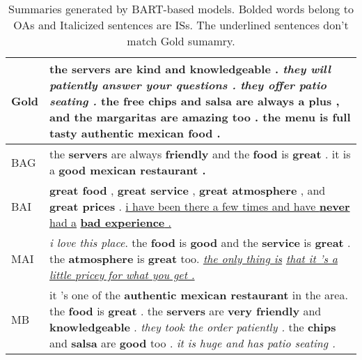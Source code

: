 \begin{table}[th]
	\begin{center}
		\scriptsize
		\begin{tabular}{|l|m{6.2cm}|}	
			\hline
			Gold & 
			the \textbf{servers} are \textbf{kind} and \textbf{knowledgeable} . \textit{they will} 
			\textit{patiently answer your questions .} \textit{they offer patio  seating .} 
			the \textbf{free chips} and \textbf{salsa} are always a plus , and the \textbf{margaritas} are \textbf{amazing} too . the menu is \textbf{full tasty authentic mexican food .} \\
			\hline
			BAG & the \textbf{servers} are always \textbf{friendly} and the \textbf{food} is \textbf{great} . it is a \textbf{good mexican restaurant .} \\
			\hline
			BAI & \textbf{great food} , \textbf{great service} , \textbf{great atmosphere} , and \textbf{great prices} . \underline{i have been there a few times and have \textbf{never} had a} \underline{\textbf{bad experience} . }
			\vspace{0.15em}
			\\
			\hline
			MAI & \textit{i love this place}. the \textbf{food} is \textbf{good} and the \textbf{service} is \textbf{great} . the \textbf{atmosphere} is \textbf{great} too. 
			\textit{\underline{the only thing is} \underline{that it 's a little pricey for what you get .}}
			\vspace{0.15em}
			\\
			\hline
			MB & it 's one of the \textbf{authentic mexican restaurant} in the area. the \textbf{food} is \textbf{great} . the \textbf{servers} are \textbf{very friendly} and \textbf{knowledgeable} . \textit{they took the order patiently . } the \textbf{chips} and \textbf{salsa} are \textbf{good} too . \textit{it is huge and has patio seating .}  
			\\
			\hline
		\end{tabular}
	\end{center}
	\caption{Summaries generated by BART-based models. Bolded words belong to OAs and Italicized sentences are ISs. The underlined sentences don't match Gold sumamry.
	}\label{tab:exp}  
\end{table}

